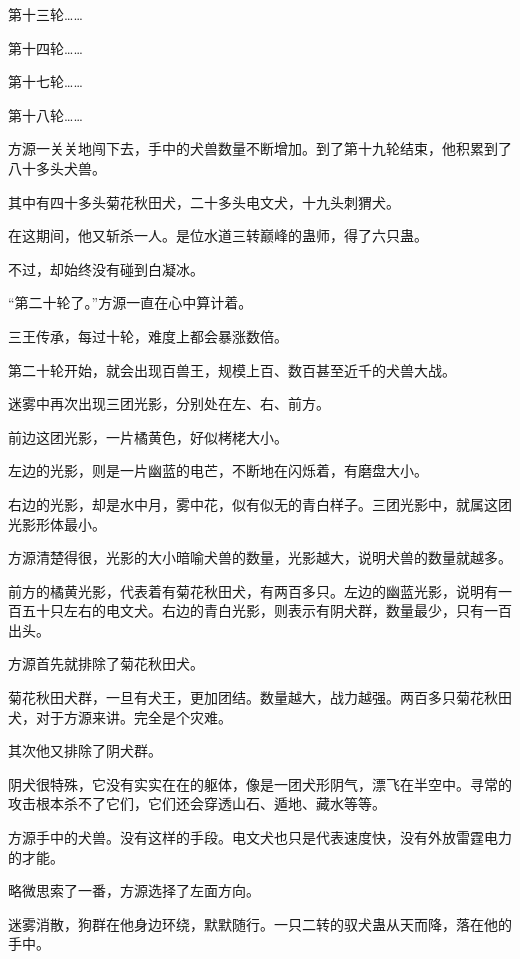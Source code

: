 
\begin{this_body}



第十三轮……

第十四轮……

第十七轮……

第十八轮……

方源一关关地闯下去，手中的犬兽数量不断增加。到了第十九轮结束，他积累到了八十多头犬兽。

其中有四十多头菊花秋田犬，二十多头电文犬，十九头刺猬犬。

在这期间，他又斩杀一人。是位水道三转巅峰的蛊师，得了六只蛊。

不过，却始终没有碰到白凝冰。

“第二十轮了。”方源一直在心中算计着。

三王传承，每过十轮，难度上都会暴涨数倍。

第二十轮开始，就会出现百兽王，规模上百、数百甚至近千的犬兽大战。

迷雾中再次出现三团光影，分别处在左、右、前方。

前边这团光影，一片橘黄色，好似栲栳大小。

左边的光影，则是一片幽蓝的电芒，不断地在闪烁着，有磨盘大小。

右边的光影，却是水中月，雾中花，似有似无的青白样子。三团光影中，就属这团光影形体最小。

方源清楚得很，光影的大小暗喻犬兽的数量，光影越大，说明犬兽的数量就越多。

前方的橘黄光影，代表着有菊花秋田犬，有两百多只。左边的幽蓝光影，说明有一百五十只左右的电文犬。右边的青白光影，则表示有阴犬群，数量最少，只有一百出头。

方源首先就排除了菊花秋田犬。

菊花秋田犬群，一旦有犬王，更加团结。数量越大，战力越强。两百多只菊花秋田犬，对于方源来讲。完全是个灾难。

其次他又排除了阴犬群。

阴犬很特殊，它没有实实在在的躯体，像是一团犬形阴气，漂飞在半空中。寻常的攻击根本杀不了它们，它们还会穿透山石、遁地、藏水等等。

方源手中的犬兽。没有这样的手段。电文犬也只是代表速度快，没有外放雷霆电力的才能。

略微思索了一番，方源选择了左面方向。

迷雾消散，狗群在他身边环绕，默默随行。一只二转的驭犬蛊从天而降，落在他的手中。


\end{this_body}
